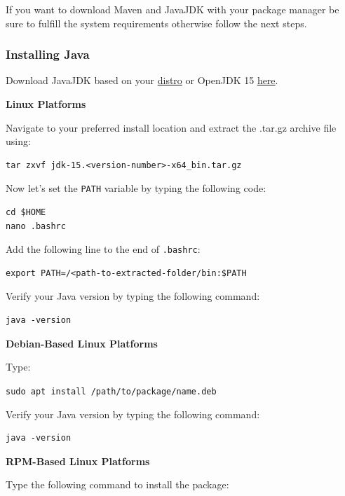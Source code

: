 \documentclass[table, 12pt]{article}
\begin{document}
If you want to download Maven and JavaJDK with your package manager be
sure to fulfill the system requirements otherwise follow the next
steps.

\subsubsection{Installing Java}\label{installing-java-1}

Download JavaJDK based on your
\href{https://www.oracle.com/java/technologies/javase-jdk15-downloads.html}{distro}
or OpenJDK 15
\href{https://download.java.net/java/GA/jdk15.0.1/664493ef4a6946b186ff29eb326336a2/7/GPL/openjdk-15.0.1_linux-x64_bin.tar.gz}{here}.

\textbf{Linux Platforms}

Navigate to your preferred install location and extract the .tar.gz
archive file using:

\begin{verbatim}
tar zxvf jdk-15.<version-number>-x64_bin.tar.gz
\end{verbatim}

Now let's set the \texttt{PATH} variable by typing the following code:

\begin{verbatim}
cd $HOME 
nano .bashrc
\end{verbatim}

Add the following line to the end of \texttt{.bashrc}:

\begin{verbatim}
export PATH=/<path-to-extracted-folder/bin:$PATH
\end{verbatim}

Verify your Java version by typing the following command:

\begin{verbatim}
java -version
\end{verbatim}

\textbf{Debian-Based Linux Platforms}

Type:

\texttt{sudo apt install /path/to/package/name.deb}

Verify your Java version by typing the following command:

\begin{verbatim}
java -version
\end{verbatim}

\textbf{RPM-Based Linux Platforms}

Type the following command to install the package:
\end{document}

